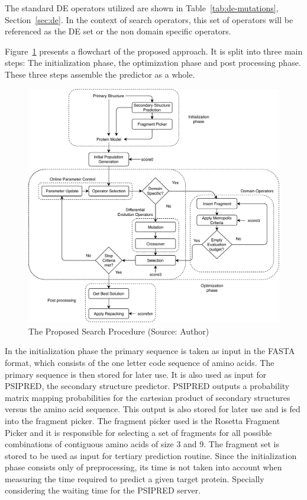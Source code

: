 The standard DE operators utilized are shown in Table~\ref{tab:de-mutations},
Section~\ref{sec:de}. In the context of search operators,
this set of operators will be referenced as
the DE set or the non domain specific operators.

Figure~\ref{fig:search-procedure} presents a flowchart of the proposed
approach. It is split into three main steps: The initialization phase, the
optimization phase and post processing phase. These three steps assemble the
predictor as a whole.

\begin{figure}
    \centering
    \includegraphics[width=\linewidth]{Figuras/search-procedure.pdf}
    \caption{The Proposed Search Procedure (Source: Author)}
    \label{fig:search-procedure}
\end{figure}

In the initialization phase the primary sequence is taken as input in the FASTA
format, which consists of the one letter code sequence of amino acids. The
primary sequence is then stored for later use. It is also used as input for
PSIPRED, the secondary structure predictor. PSIPRED outputs a probability
matrix mapping probabilities for the cartesian product of secondary structures
versus the amino acid sequence. This output is also stored for later use and is
fed into the fragment picker.  The fragment picker used is the Rosetta Fragment
Picker and it is responsible for selecting a set of fragments for all possible
combinations of contiguous amino acids of size 3 and 9. The fragment set is
stored to be used as input for tertiary prediction routine. Since the
initialization phase consists only of preprocessing, its time is not taken into
account when measuring the time required to predict a given target protein.
Specially considering the waiting time for the PSIPRED server.

